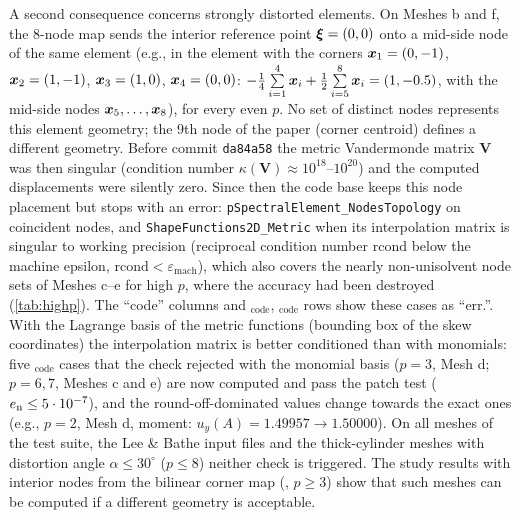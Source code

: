 \documentclass[10pt,a4paper]{article}
\begin{document}
A second consequence concerns strongly distorted elements. On Meshes b and f, the 8-node map sends
the interior reference point $\bm{\xi}=(0,0)$ onto a mid-side node of the same element (e.g., in the
element with the corners $\bm{x}_1=(0,-1)$, $\bm{x}_2=(1,-1)$, $\bm{x}_3=(1,0)$, $\bm{x}_4=(0,0)$:
$-\tfrac14\sum\limits^{4}_{i=1}\bm{x}_i+\tfrac12\sum\limits^{8}_{i=5}\bm{x}_i=(1,-0.5)$, with the mid-side
nodes $\bm{x}_5,\dots,\bm{x}_8$), for every even $p$. No set of distinct nodes represents this element
geometry; the 9th node of the paper (corner centroid) defines a different geometry. Before commit
\texttt{da84a58} the metric Vandermonde matrix $\bm V$ was then singular
(condition number $\kappa(\bm V)\approx10^{18}$--$10^{20}$) and the computed displacements were silently zero.
Since then the code base keeps this node placement but stops with an error:
\texttt{pSpectralElement\_NodesTopology} on coincident nodes, and \texttt{ShapeFunctions2D\_Metric}
when its interpolation matrix is singular to working precision (reciprocal condition number
$\mathrm{rcond}$ below the machine epsilon, $\mathrm{rcond}<\varepsilon_{\mathrm{mach}}$),
which also covers the nearly non-unisolvent node sets of Meshes c--e for high $p$, where the
accuracy had been destroyed (\cref{tab:highp}). The ``code'' columns and
\PM$_\mathrm{code}$, \PH$_\mathrm{code}$ rows show these cases as ``err.''. With the Lagrange basis
of the metric functions (bounding box of the skew coordinates) the interpolation matrix is better
conditioned than with monomials: five \PM$_\mathrm{code}$ cases that the check rejected with the
monomial basis ($p=3$, Mesh d; $p=6,7$, Meshes c and e) are now computed and pass the patch test
($e_{\mathrm{n}}\le5\cdot10^{-7}$), and the round-off-dominated values change towards the exact ones (e.g.,
$p=2$, Mesh d, moment: $u_y(A)=1.49957\to1.50000$). On all meshes of the test suite, the
Lee \& Bathe input files and the thick-cylinder meshes with distortion angle $\alpha\le30^\circ$ ($p\le8$) neither
check is triggered. The study results with interior nodes from the bilinear corner map
(\PM, $p\ge3$) show that such meshes can be computed if a different geometry is acceptable.
\end{document}
